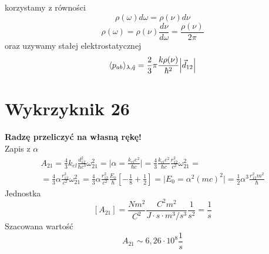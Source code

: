 \documentclass[a4paper,12pt]{article}
\begin{document}
korzystamy z równości
\begin{equation*}
  \rho(\omega) d\omega = \rho(\nu)d\nu
\end{equation*}
\begin{equation*}
  \rho(\omega) = \rho(\nu) \frac{d\nu}{d\omega} = \frac{\rho(\nu)}{2\pi}
\end{equation*}
oraz uzywamy stałej elektrostatycznej
\begin{equation*}
  \langle p_{ab} \rangle_{\lambda, \hat{q}} = \frac{2}{3} \pi
\frac{k\rho(\nu)}{\hbar^2} \abs{\vec{d}_{12}}
\end{equation*}


\section{Wykrzyknik 26}
\textbf{Radzę przeliczyć na własną rękę!}\\
	Zapis z $\alpha$
	$$
	\begin{gathered}
		A_{21} = \frac{4}{3}k_{el}\frac{d_{12}^2}{\hbar c^3}\omega_{21}^2 = \bigg\vert \alpha = \frac{k_{el} e^2}{\hbar c} \bigg\vert = \frac{4}{3} \frac{k_{el} e^2}{\hbar c}
				\frac{r_{12}^2}{c^2}\omega_{21}^2 =\\
				=\frac{4}{3} \alpha \frac{r_{12}^2}{c^2}\omega_{21}^2 = \frac{4}{3} \alpha \frac{r_{12}^2}{c^2} \frac{E_0}{\hbar}\left[-\frac{1}{8}+\frac{1}{2}\right] = 
				\bigg\vert E_0 = \alpha^2 (mc)^2\bigg\vert = \frac{1}{2}\alpha^3 \frac{r_{12}^2m^2}{\hbar}
	\end{gathered}
	$$
	Jednostka
	$$
	[A_{21}] = \frac{Nm^2}{C^2}\frac{C^2 m^2}{J\cdot s\cdot m^3/s^3}\frac{1}{s^2} = \frac{1}{s}
	$$
	Szacowana wartość
	$$
	A_{21} \sim 6,26 \cdot10^{8} \frac{1}{s}
	$$
\end{document}
